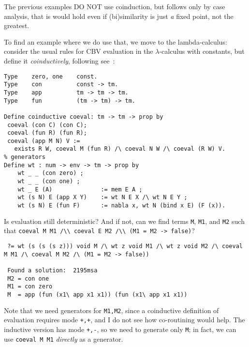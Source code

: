 \documentclass[a4paper]{easychair}
\begin{document}
The previous examples DO NOT use coinduction, but follows only by case
analysis, that is would hold even if (bi)similarity is just \emph{a}
fixed point, not the greatest.

To find an example where we do use that, we move to the lambda-calculus:
 consider the usual rules for CBV
evaluation in the $\lambda$-calculus with constants, but define it
\emph{coinductively}, following see~\cite{2007-Leroy-Grall}:
\begin{lstlisting}
Type    zero, one    const.
Type    con          const -> tm.
Type    app          tm -> tm -> tm.
Type    fun          (tm -> tm) -> tm.

Define coinductive coeval: tm -> tm -> prop by
 coeval (con C) (con C);
 coeval (fun R) (fun R);
 coeval (app M N) V := 
   exists R W, coeval M (fun R) /\ coeval N W /\ coeval (R W) V.
% generators
Define wt : num -> env -> tm -> prop by
    wt _ _ (con zero) ;
    wt _ _ (con one) ;
    wt _ E (A)              := mem E A ;
    wt (s N) E (app X Y)    := wt N E X /\ wt N E Y ;
    wt (s N) E (fun F)      := nabla x, wt N (bind x E) (F (x)).

\end{lstlisting}
Is evaluation still deterministic?  And if not, can we find terms
\lstinline{M}, \lstinline{M1}, and \lstinline{M2} such that
\mbox{\lstinline{coeval M M1 /\\ coeval E M2 /\\ (M1 = M2 -> false)}}?
\begin{lstlisting}
 ?= wt (s (s (s z))) void M /\ wt z void M1 /\ wt z void M2 /\ coeval M M1 /\ coeval M M2 /\ (M1 = M2 -> false))

 Found a solution:  2195msa
 M2 = con one
 M1 = con zero
 M  = app (fun (x1\ app x1 x1)) (fun (x1\ app x1 x1))
\end{lstlisting}

Note that we need generators for \texttt{M1,M2}, since a coinductive
definition of evaluation requires mode \texttt{+,+}, and I do not
see how co-routining would help. The inductive version has mode
\texttt{+,-}, so we need to generate only \texttt{M}; in fact, we can
use \texttt{coeval M M1} \emph{directly} as a generator.


 
\end{document}

